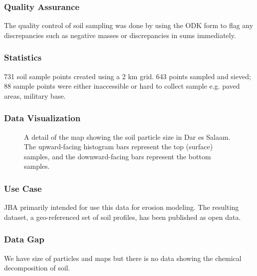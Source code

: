 \documentclass[a4paper,12pt,twoside]{article}
\begin{document}
\subsubsection{Quality Assurance}
The quality control of soil sampling was done by  using the ODK form to flag any discrepancies such as negative masses or discrepancies in sums immediately.

\subsubsection{Statistics}
731 soil sample points created using a 2 km grid. 643 points sampled and sieved; 88 sample points were either inaccessible or hard to collect sample e.g. paved areas, military base.

\subsubsection{Data Visualization}
\begin{figure}[h]
  \caption{A detail of the map showing the soil particle size in Dar es Salaam. The upward-facing histogram bars represent the top (surface) samples, and the downward-facing bars represent the bottom samples.}
  \centering
\end{figure}

\subsubsection{Use Case}
JBA  primarily intended for use this data for erosion modeling. The resulting dataset, a geo-referenced set of soil profiles, has been published as open data.

\subsubsection{Data Gap}
We have size of particles and maps but there is no data showing the chemical decomposition of soil.
\end{document}
